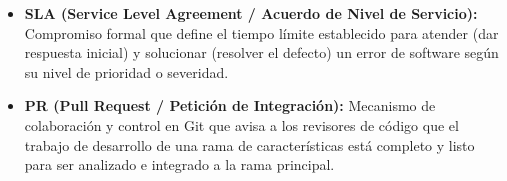 \begin{itemize}
  las consultas normales pero se conserve el registro histórico para
  auditoría.
\item
  \textbf{SLA (Service Level Agreement / Acuerdo de Nivel de Servicio):}
  Compromiso formal que define el tiempo límite establecido para atender
  (dar respuesta inicial) y solucionar (resolver el defecto) un error de
  software según su nivel de prioridad o severidad.
\item
  \textbf{PR (Pull Request / Petición de Integración):} Mecanismo de
  colaboración y control en Git que avisa a los revisores de código que
  el trabajo de desarrollo de una rama de características está completo
  y listo para ser analizado e integrado a la rama principal.
\end{itemize}